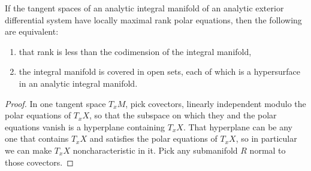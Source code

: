 \begin{corollary}\label{corollary:local.CK}
If the tangent spaces of an analytic integral manifold of an analytic exterior differential system have locally maximal rank polar equations, then the following are equivalent:
\begin{enumerate}
\item that rank is less than the codimension of the integral manifold,
\item the integral manifold is covered in open sets, each of which is a hypersurface in an analytic integral manifold.
\end{enumerate}
\end{corollary}
\begin{proof}
In one tangent space \(T_x M\), pick covectors, linearly independent modulo the polar equations of \(T_x X\), so that the subspace on which they and the polar equations vanish is a hyperplane containing \(T_x X\).
That hyperplane can be any one that contains \(T_x X\) and satisfies the polar equations of \(T_x X\), so in particular we can make \(T_x X\) noncharacteristic in it.
Pick any submanifold \(R\) normal to those covectors.
\end{proof}

